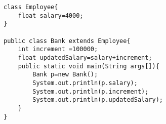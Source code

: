 \documentclass{article}
\begin{document}
\begin{verbatim}
class Employee{
    float salary=4000;
}

public class Bank extends Employee{
    int increment =100000;
    float updatedSalary=salary+increment;
    public static void main(String args[]){
        Bank p=new Bank();
        System.out.println(p.salary);
        System.out.println(p.increment);
        System.out.println(p.updatedSalary);
    }
}
\end{verbatim}
\end{document}
